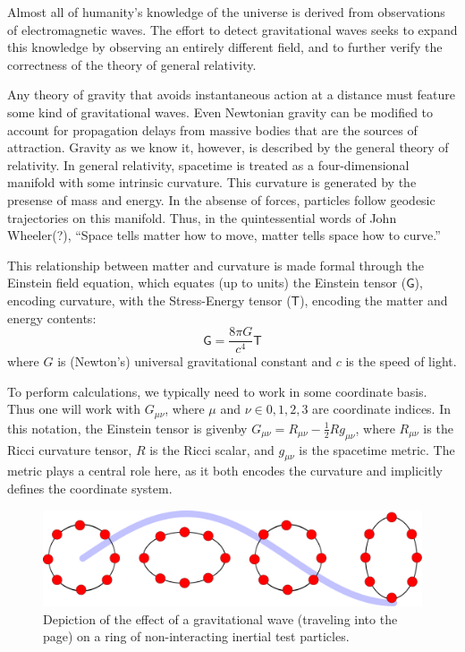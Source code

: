 \label{chapter1}
\doublespace


Almost all of humanity's knowledge of the universe is derived from
observations of electromagnetic waves.  The effort to detect
gravitational waves seeks to expand this knowledge by observing an
entirely different field, and to further verify the correctness of the
theory of general relativity.

Any theory of gravity that avoids instantaneous action at a distance
must feature some kind of gravitational waves.  Even Newtonian gravity
can be modified to account for propagation delays from massive bodies
that are the sources of attraction\cite{Schutz1984Gravitational}.
Gravity as we know it, however, is described by the general theory of
relativity.  In general relativity, spacetime is treated as a
four-dimensional manifold with some intrinsic curvature.  This
curvature is generated by the presense of mass and energy.  In the
absense of forces, particles follow geodesic trajectories on this
manifold.  Thus, in the quintessential words of John Wheeler(?),
``Space tells matter how to move, matter tells space how to curve.''

This relationship between matter and curvature is made formal through
the Einstein field equation, which equates (up to units) the Einstein
tensor ($\mathsf{G}$), encoding curvature, with the
Stress-Energy tensor ($\mathsf{T}$), encoding the matter and energy
contents:
\begin{equation}
\mathsf{G} = \frac {8\pi G}{c^4} \mathsf{T}
\end{equation}
where $G$ is (Newton's) universal gravitational constant and $c$ is
the speed of light.

To perform calculations, we typically need to work in some coordinate
basis.  Thus one will work with $G_{\mu\nu}$, where $\mu$ and $\nu \in
{0,1,2,3}$ are coordinate indices.  In this notation, the Einstein
tensor is givenby $G_{\mu\nu} = R_{\mu\nu} - \frac{1}{2} R
g_{\mu\nu}$, where $R_{\mu\nu}$ is the Ricci curvature tensor, $R$ is
the Ricci scalar, and $g_{\mu\nu}$ is the spacetime metric.  The
metric plays a central role here, as it both encodes the curvature and
implicitly defines the coordinate system.

\begin{figure}
\includegraphics[width=\columnwidth]{chapter1/figures/gwave.pdf}
\caption{\label{fig:gwave-effect}Depiction of the effect of a
  gravitational wave (traveling into the page) on a ring of
  non-interacting inertial test particles.}
\end{figure}

